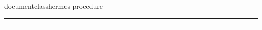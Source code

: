 documentclass{hermes-procedure}



\maketitle

\hrule
\vspace{0.5cm}

\toolstable %

\materialstable %

\newpage
\maketitle

\hrule
\vspace{0.5cm}

\executiontable %

\signaturesection


